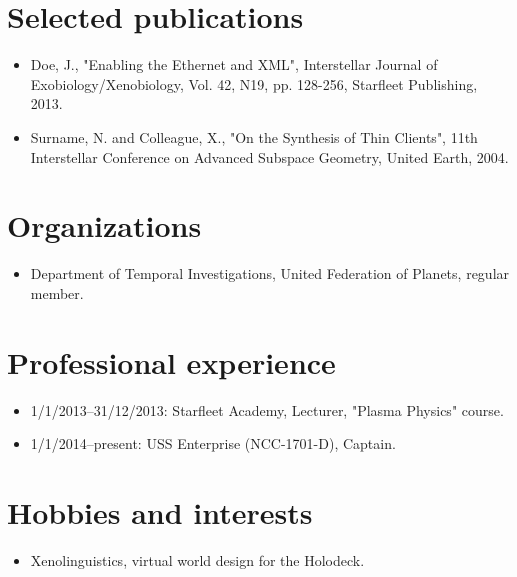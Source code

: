 \documentclass[10pt]{article}
\begin{document}
\section*{Selected publications}

\begin{itemize}
  \item Doe, J., "Enabling the Ethernet and XML", Interstellar Journal of  Exobiology/Xenobiology, Vol. 42, N19, pp. 128-256, Starfleet Publishing, 2013.
  \item Surname, N. and Colleague, X., "On the Synthesis of Thin Clients", 11th Interstellar Conference on Advanced Subspace Geometry, United Earth, 2004.
\end{itemize}

\section*{Organizations}

\begin{itemize}
  \item Department of Temporal Investigations, United Federation of Planets, regular member.
\end{itemize}

\section*{Professional experience}

\begin{itemize}
  \item 1/1/2013--31/12/2013: Starfleet Academy, Lecturer, "Plasma Physics" course.
  \item 1/1/2014--present: USS Enterprise (NCC-1701-D), Captain.
\end{itemize}

\section*{Hobbies and interests}

\begin{itemize}
  \item Xenolinguistics, virtual world design for the Holodeck.
\end{itemize}
\end{document}
